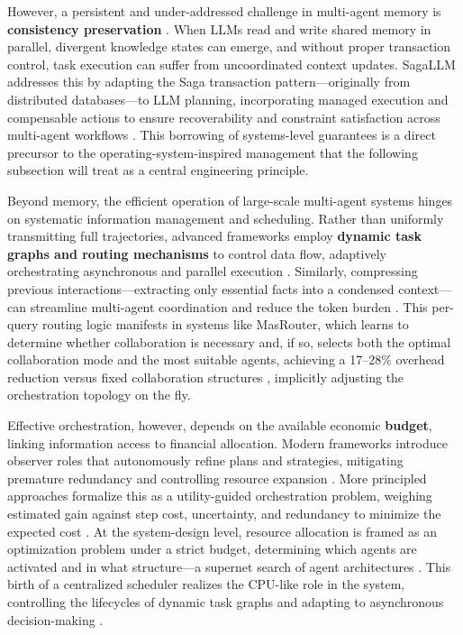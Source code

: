 \documentclass[11pt,a4paper]{article}
\begin{document}
However, a persistent and under-addressed challenge in multi-agent memory is \textbf{consistency preservation} \cite{arxiv:2603.10062v2}. When LLMs read and write shared memory in parallel, divergent knowledge states can emerge, and without proper transaction control, task execution can suffer from uncoordinated context updates. SagaLLM addresses this by adapting the Saga transaction pattern---originally from distributed databases---to LLM planning, incorporating managed execution and compensable actions to ensure recoverability and constraint satisfaction across multi-agent workflows \cite{arxiv:2503.11951v3}. This borrowing of systems-level guarantees is a direct precursor to the operating-system-inspired management that the following subsection will treat as a central engineering principle.

Beyond memory, the efficient operation of large-scale multi-agent systems hinges on systematic information management and scheduling. Rather than uniformly transmitting full trajectories, advanced frameworks employ \textbf{dynamic task graphs and routing mechanisms} to control data flow, adaptively orchestrating asynchronous and parallel execution \cite{arxiv:2503.07675v2}. Similarly, compressing previous interactions---extracting only essential facts into a condensed context---can streamline multi-agent coordination and reduce the token burden \cite{arxiv:2308.05960v1}. This per-query routing logic manifests in systems like MasRouter, which learns to determine whether collaboration is necessary and, if so, selects both the optimal collaboration mode and the most suitable agents, achieving a 17--28\% overhead reduction versus fixed collaboration structures \cite{arxiv:2502.11133v1}, implicitly adjusting the orchestration topology on the fly.

Effective orchestration, however, depends on the available economic \textbf{budget}, linking information access to financial allocation. Modern frameworks introduce observer roles that autonomously refine plans and strategies, mitigating premature redundancy and controlling resource expansion \cite{arxiv:2309.17288v2}. More principled approaches formalize this as a utility-guided orchestration problem, weighing estimated gain against step cost, uncertainty, and redundancy to minimize the expected cost \cite{arxiv:2603.19896v1}. At the system-design level, resource allocation is framed as an optimization problem under a strict budget, determining which agents are activated and in what structure---a supernet search of agent architectures \cite{arxiv:2502.04180v2}. This birth of a centralized scheduler realizes the CPU-like role in the system, controlling the lifecycles of dynamic task graphs and adapting to asynchronous decision-making \cite{arxiv:2503.07675v2}.
\end{document}
